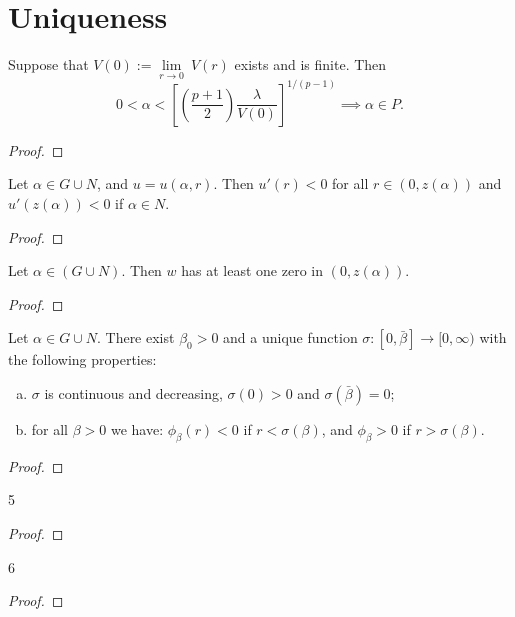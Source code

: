 \chapter{Uniqueness}
\label{uniqueness}

\begin{lemma}\label{lya}
Suppose that $V(0):=\underset{r\to0}{\lim}~V(r)$ exists and is finite. Then
\[ 0<\alpha<\left[\left(\frac{p+1}{2}\right)\frac{\lambda}{V(0)}
\right]^{1/(p-1)}\implies \alpha\in P. \]
\end{lemma}
\begin{proof}
\end{proof}

\begin{lemma}
Let $\alpha\in G\cup N$, and $u=u(\alpha,r)$. Then $u'(r)<0$ for all $r\in(0,z(\alpha))$ and $u'(z(\alpha))<0$ if $\alpha\in N$.
\end{lemma}
\begin{proof}
\end{proof}

\begin{lemma}
Let $\alpha\in (G\cup N).$ Then $w$ has at least one zero in $(0,z(\alpha))$.
\end{lemma}
\begin{proof}
\end{proof}

\begin{lemma}
Let $\alpha\in G\cup N$. There exist $\beta_0>0$ and a unique function $\sigma:[0,\bar\beta]\to[0,\infty)$ with the following properties:
\begin{enumerate}[(a)]
\item  $\sigma$ is continuous and decreasing, $\sigma(0)>0$ and $\sigma(\bar\beta)=0$;
\item for all $\beta>0$ we have: $\phi_\beta(r)<0$ if $r<\sigma(\beta)$, and $\phi_\beta>0$ if $r>\sigma(\beta)$.
\end{enumerate}
\end{lemma}
\begin{proof}
\end{proof}

\begin{lemma}
5
\end{lemma}
\begin{proof}
\end{proof}

\begin{lemma}
6
\end{lemma}
\begin{proof}
\end{proof}

